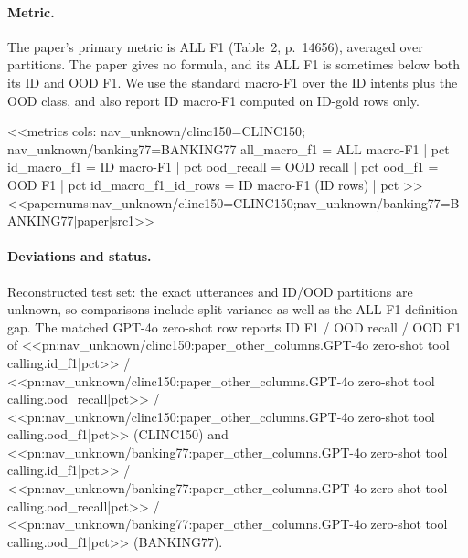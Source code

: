\paragraph{Metric.} The paper's primary metric is ALL F1 (Table~2, p.~14656), averaged over partitions. The paper
gives no formula, and its ALL F1 is sometimes below both its ID and OOD F1. We use the standard macro-F1 over the ID
intents plus the OOD class, and also report ID macro-F1 computed on ID-gold rows only.

<<metrics
cols: nav_unknown/clinc150=CLINC150; nav_unknown/banking77=BANKING77
all_macro_f1 = ALL macro-F1 | pct
id_macro_f1 = ID macro-F1 | pct
ood_recall = OOD recall | pct
ood_f1 = OOD F1 | pct
id_macro_f1_id_rows = ID macro-F1 (ID rows) | pct
>>
<<papernums:nav_unknown/clinc150=CLINC150;nav_unknown/banking77=BANKING77|paper|src1>>

\paragraph{Deviations and status.} Reconstructed test set: the exact utterances and ID/OOD partitions are unknown,
so comparisons include split variance as well as the ALL-F1 definition gap. The matched GPT-4o zero-shot row reports
ID F1 / OOD recall / OOD F1 of
<<pn:nav_unknown/clinc150:paper_other_columns.GPT-4o zero-shot tool calling.id_f1|pct>> /
<<pn:nav_unknown/clinc150:paper_other_columns.GPT-4o zero-shot tool calling.ood_recall|pct>> /
<<pn:nav_unknown/clinc150:paper_other_columns.GPT-4o zero-shot tool calling.ood_f1|pct>> (CLINC150) and
<<pn:nav_unknown/banking77:paper_other_columns.GPT-4o zero-shot tool calling.id_f1|pct>> /
<<pn:nav_unknown/banking77:paper_other_columns.GPT-4o zero-shot tool calling.ood_recall|pct>> /
<<pn:nav_unknown/banking77:paper_other_columns.GPT-4o zero-shot tool calling.ood_f1|pct>> (BANKING77).
